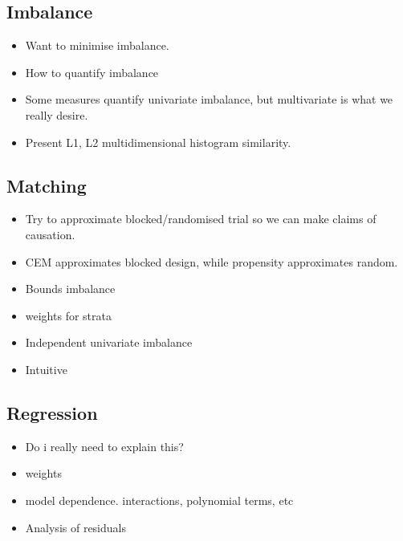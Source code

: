 \subsection{Imbalance}
\begin{itemize}
    \item Want to minimise imbalance.
    \item How to quantify imbalance
    \item Some measures quantify univariate imbalance, but multivariate is what we really desire.
    \item Present L1, L2 multidimensional histogram similarity.
\end{itemize}
\subsection{Matching}
\begin{itemize}
    \item Try to approximate blocked/randomised trial so we can make claims of causation.
    \item CEM approximates blocked design, while propensity approximates random.
    \item Bounds imbalance
    \item weights for strata
    \item Independent univariate imbalance
    \item Intuitive
\end{itemize}
\subsection{Regression}
\begin{itemize}
    \item Do i really need to explain this?
    \item weights
    \item model dependence. interactions, polynomial terms, etc
    \item Analysis of residuals
\end{itemize}